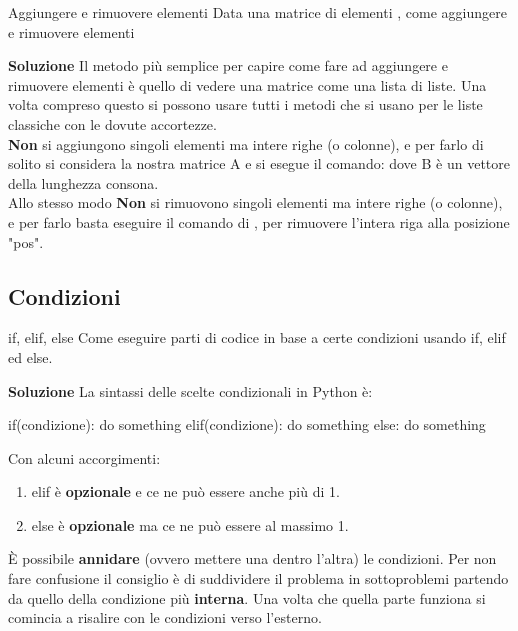 \documentclass[10pt]{extarticle}
\makeatletter
\newcommand{\<}{\langle}
\renewcommand{\>}{\rangle}
\renewenvironment{proof}[1][\proofname] {\par\pushQED{\qed}
\renewcommand*{\proofname}{Soluzione}
{\normalfont\sffamily\bfseries\topsep6\p@\@plus6\p@\relax #1\@addpunct{.} }}{\popQED\endtrivlist\@endpefalse}
\theoremstyle{mystyle}{\newtheorem*{remark}{Nota}}
\theoremstyle{mystyle}{\newtheorem*{remarks}{Note}}
\theoremstyle{mystyle}{\newtheorem*{example}{Esempio}}
\theoremstyle{mystyle}{\newtheorem*{examples}{Esempi}}
\theoremstyle{definition}{\newtheorem*{exercise}{Exercise}}
\theoremstyle{warn}
\makeatother
\begin{document}
\begin{definition}{Aggiungere e rimuovere elementi}{}
Data una matrice di elementi , come aggiungere e rimuovere elementi
\end{definition}
\begin{proof}
Il metodo più semplice per capire come fare ad aggiungere e rimuovere elementi è quello di vedere una matrice come una lista di liste. Una volta compreso questo si possono usare tutti i metodi che si usano per le liste classiche con le dovute accortezze.\\
\textbf{Non} si aggiungono singoli elementi ma intere righe (o colonne), e per farlo di solito si considera la nostra matrice A e si esegue il comando:  dove B è un vettore della lunghezza consona.\\
Allo stesso modo \textbf{Non} si rimuovono singoli elementi ma intere righe (o colonne), e per farlo basta eseguire il comando di , per rimuovere l'intera riga alla posizione "pos".
\end{proof}

\subsection{Condizioni}

\begin{definition}{if, elif, else}{}
Come eseguire parti di codice in base a certe condizioni usando if, elif ed else.
\end{definition}
\begin{proof}
La sintassi delle scelte condizionali in Python è:
\begin{python}
if(condizione):
    do something
elif(condizione):
    do something
else:
    do something
\end{python}
Con alcuni accorgimenti:
\begin{enumerate}
    \item elif è \textbf{opzionale} e ce ne può essere anche più di 1.
    \item else è \textbf{opzionale} ma ce ne può essere al massimo 1.
\end{enumerate}
\end{proof}
\begin{remark}
È possibile \textbf{annidare} (ovvero mettere una dentro l'altra) le condizioni. Per non fare confusione il consiglio è di suddividere il problema in sottoproblemi partendo da quello della condizione più \textbf{interna}. Una volta che quella parte funziona si comincia a risalire con le condizioni verso l'esterno.
\end{remark}
\end{document}
